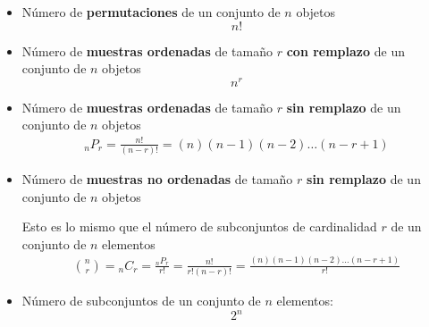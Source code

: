 \documentclass[12pt, fleqn]{report}                             %
\theoremstyle{break}                                            %
\begin{document}
            \begin{itemize}
                \item 
                    Número de \textbf{permutaciones} de un conjunto de $n$ objetos
                    \begin{equation}
                        n!
                    \end{equation}

                \item
                    Número de \textbf{muestras ordenadas} de tamaño $r$
                    \textbf{con remplazo} de un conjunto de $n$ objetos
                    \begin{equation}
                        n^r
                    \end{equation}

                \item
                    Número de \textbf{muestras ordenadas} de tamaño $r$
                    \textbf{sin remplazo} de un conjunto de $n$ objetos
                    \begin{align}
                        {}_nP_r
                            = \frac{n!}{(n - r)!}          
                            = (n)(n-1)(n-2)\dots(n-r+1) 
                    \end{align}

                \item
                    Número de \textbf{muestras no ordenadas} de tamaño $r$
                    \textbf{sin remplazo} de un conjunto de $n$ objetos

                    Esto es lo mismo que el número de subconjuntos de cardinalidad $r$ de
                    un conjunto de $n$ elementos
                    \begin{align}
                        {n \choose r}
                            = {}_nC_r 
                            = \frac{{}_nP_r}{r!}          
                            = \frac{n!}{r!(n-r)!}          
                            = \frac{(n)(n-1)(n-2)\dots(n-r+1)}{r!}          
                    \end{align}

                \item
                    Número de subconjuntos de un conjunto de $n$ elementos:
                    \begin{equation}
                        2^n
                    \end{equation}


            \end{itemize}
\end{document}
